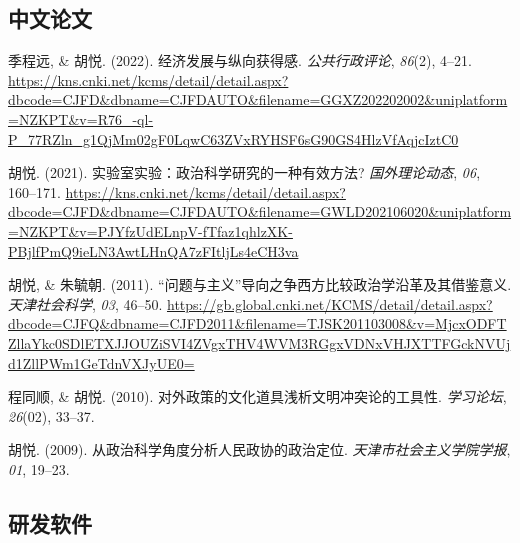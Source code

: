 \documentclass[11pt,a4paper,]{awesome-cv}
\begin{document}
\endgroup

\hypertarget{ux4e2dux6587ux8bbaux6587}{%
\subsection{\texorpdfstring{\textbf{中文论文}}{中文论文}}\label{ux4e2dux6587ux8bbaux6587}}

\begingroup
\setlength{\parindent}{-0.5in}
\setlength{\leftskip}{0.5in}

\hypertarget{bibliography}{}
\leavevmode{}%
季程远, \& 胡悦. (2022). 经济发展与纵向获得感. \emph{公共行政评论},
\emph{86}(2), 4--21.
\url{https://kns.cnki.net/kcms/detail/detail.aspx?dbcode=CJFD\&dbname=CJFDAUTO\&filename=GGXZ202202002\&uniplatform=NZKPT\&v=R76_-ql-P_77RZln_g1QjMm02gF0LqwC63ZVxRYHSF6sG90GS4HlzVfAqjcIztC0}

\leavevmode{}%
胡悦. (2021). 实验室实验：政治科学研究的一种有效方法?
\emph{国外理论动态}, \emph{06}, 160--171.
\url{https://kns.cnki.net/kcms/detail/detail.aspx?dbcode=CJFD\&dbname=CJFDAUTO\&filename=GWLD202106020\&uniplatform=NZKPT\&v=PJYfzUdELnpV-fTfaz1qhlzXK-PBjlfPmQ9ieLN3AwtLHnQA7zFItljLs4eCH3va}

\leavevmode{}%
胡悦, \& 朱毓朝. (2011).
{``问题与主义''}导向之争西方比较政治学沿革及其借鉴意义.
\emph{天津社会科学}, \emph{03}, 46--50.
\url{https://gb.global.cnki.net/KCMS/detail/detail.aspx?dbcode=CJFQ\&dbname=CJFD2011\&filename=TJSK201103008\&v=MjcxODFTZllaYkc0SDlETXJJOUZiSVI4ZVgxTHV4WVM3RGgxVDNxVHJXTTFGckNVUjd1ZllPWm1GeTdnVXJyUE0=}

\leavevmode{}%
程同顺, \& 胡悦. (2010). 对外政策的文化道具浅析文明冲突论的工具性.
\emph{学习论坛}, \emph{26}(02), 33--37.

\leavevmode{}%
胡悦. (2009). 从政治科学角度分析人民政协的政治定位.
\emph{天津市社会主义学院学报}, \emph{01}, 19--23.

\endgroup

\hypertarget{ux7814ux53d1ux8f6fux4ef6}{%
\subsection{\texorpdfstring{\textbf{研发软件}}{研发软件}}\label{ux7814ux53d1ux8f6fux4ef6}}

\begingroup
\setlength{\parindent}{-0.5in}
\setlength{\leftskip}{0.5in}
\end{document}
